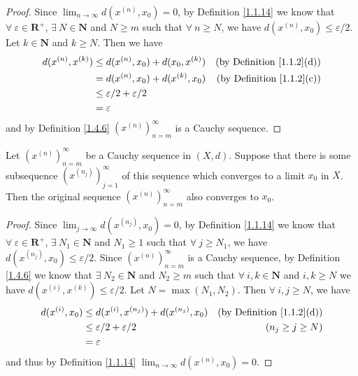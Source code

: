 \begin{proof}
    Since \(\lim_{n \to \infty} d(x^{(n)}, x_0) = 0\), by Definition \ref{1.1.14} we know that \(\forall\ \varepsilon \in \mathbf{R}^+\), \(\exists\ N \in \mathbf{N}\) and \(N \geq m\) such that \(\forall\ n \geq N\), we have \(d(x^{(n)}, x_0) \leq \varepsilon / 2\).
    Let \(k \in \mathbf{N}\) and \(k \geq N\).
    Then we have
    \begin{align*}
        d(x^{(n)}, x^{(k)}) & \leq d(x^{(n)}, x_0) + d(x_0, x^{(k)}) & \text{(by Definition \ref{1.1.2}(d))} \\
                            & = d(x^{(n)}, x_0) + d(x^{(k)}, x_0)    & \text{(by Definition \ref{1.1.2}(c))} \\
                            & \leq \varepsilon / 2 + \varepsilon / 2                                         \\
                            & = \varepsilon
    \end{align*}
    and by Definition \ref{1.4.6} \((x^{(n)})_{n = m}^\infty\) is a Cauchy sequence.
\end{proof}

\setcounter{theorem}{8}
\begin{lemma}\label{1.4.9}
    Let \((x^{(n)})_{n = m}^\infty\) be a Cauchy sequence in \((X, d)\).
    Suppose that there is some subsequence \((x^{(n_j)})_{j = 1}^\infty\) of this sequence which converges to a limit \(x_0\) in \(X\).
    Then the original sequence \((x^{(n)})_{n = m}^\infty\) also converges to \(x_0\).
\end{lemma}

\begin{proof}
    Since \(\lim_{j \to \infty} d(x^{(n_j)}, x_0) = 0\), by Definition \ref{1.1.14} we know that \(\forall\ \varepsilon \in \mathbf{R}^+\), \(\exists\ N_1 \in \mathbf{N}\) and \(N_1 \geq 1\) such that \(\forall\ j \geq N_1\), we have \(d(x^{(n_j)}, x_0) \leq \varepsilon / 2\).
    Since \((x^{(n)})_{n = m}^\infty\) is a Cauchy sequence, by Definition \ref{1.4.6} we know that \(\exists\ N_2 \in \mathbf{N}\) and \(N_2 \geq m\) such that \(\forall\ i, k \in \mathbf{N}\) and \(i, k \geq N\) we have \(d(x^{(i)}, x^{(k)}) \leq \varepsilon / 2\).
    Let \(N = \max(N_1, N_2)\).
    Then \(\forall\ i, j \geq N\), we have
    \begin{align*}
        d(x^{(i)}, x_0) & \leq d(x^{(i)}, x^{(n_j)}) + d(x^{(n_j)}, x_0) & \text{(by Definition \ref{1.1.2}(d))} \\
                        & \leq \varepsilon / 2 + \varepsilon / 2         & (n_j \geq j \geq N)                   \\
                        & = \varepsilon
    \end{align*}
    and thus by Definition \ref{1.1.14} \(\lim_{n \to \infty} d(x^{(n)}, x_0) = 0\).
\end{proof}

